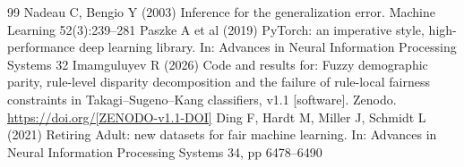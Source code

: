 \documentclass[pdflatex,sn-basic,Numbered,lineno]{sn-jnl}
\begin{document}
\begin{thebibliography}{99}
 Nadeau C, Bengio Y (2003) Inference for the generalization error. Machine Learning 52(3):239–281
 Paszke A et al (2019) PyTorch: an imperative style, high-performance deep learning library. In: Advances in Neural Information Processing Systems 32
 Imamguluyev R (2026) Code and results for: Fuzzy demographic parity, rule-level disparity decomposition and the failure of rule-local fairness constraints in Takagi–Sugeno–Kang classifiers, v1.1 [software]. Zenodo. \url{https://doi.org/[ZENODO-v1.1-DOI]}
 Ding F, Hardt M, Miller J, Schmidt L (2021) Retiring Adult: new datasets for fair machine learning. In: Advances in Neural Information Processing Systems 34, pp 6478–6490
\end{thebibliography}
\end{document}
